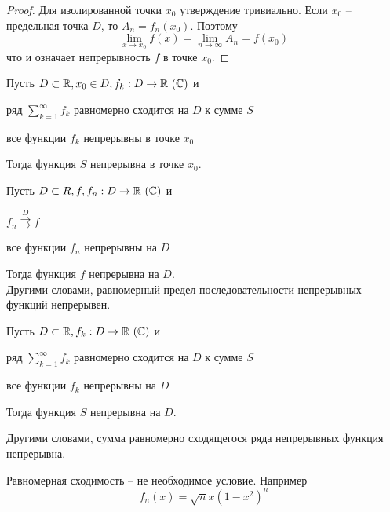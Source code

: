 \begin{proof}
	Для изолированной точки $x_0$ утверждение тривиально. Если $x_0$ -- предельная точка $D$, то $A_n = f_n(x_0)$. Поэтому
	\[\lim_{x \to x_0} f(x) = \lim_{n \to \infty} A_n = f(x_0)\]
	что и означает непрерывность $f$ в точке $x_0$.
\end{proof}

\begin{Cons}
	Пусть $D \subset \mathbb{R}, x_0 \in D, f_k : D \to \mathbb{R} \ (\mathbb{C})$ и
	\begin{MyList}
		\item ряд $\sum_{k=1}^{\infty} f_k$ равномерно сходится на $D$ к сумме $S$
		\item все функции $f_k$ непрерывны в точке $x_0$ 
	\end{MyList} 
	Тогда функция $S$ непрерывна в точке $x_0$.
\end{Cons}

\begin{Cons}
	Пусть $D \subset R, f, f_n : D \to \R \ (\C)$ и
	\begin{MyList}
		\item $f_n \overset{D}{\rightrightarrows} f$
		\item все функции $f_n$ непрерывны на $D$  
	\end{MyList} 
	Тогда функция $f$ непрерывна на $D$. \\
	Другими словами, равномерный предел последовательности непрерывных функций непрерывен.
\end{Cons}

\begin{Cons}
	Пусть $D \subset \R, f_k : D \to \R \ (\C)$ и
	\begin{MyList}
		\item ряд $\sum_{k=1}^{\infty} f_k$ равномерно сходится на $D$ к сумме $S$
		\item все функции $f_k$ непрерывны на $D$ 
	\end{MyList} 
	Тогда функция $S$ непрерывна на $D$. 

	Другими словами, сумма равномерно сходящегося ряда непрерывных функция непрерывна.
\end{Cons}

\begin{Prop}
	Равномерная сходимость -- не необходимое условие. Например
	\[f_n(x) = \sqrt{n} x(1 - x^2)^n\]
\end{Prop}

